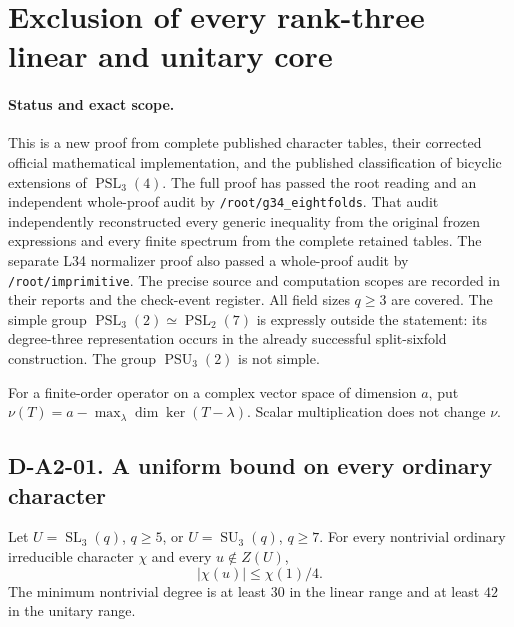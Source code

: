 \section{Exclusion of every rank-three linear and unitary core}
\label{sec:a2-cores}

\paragraph{Status and exact scope.}
This is a new proof from complete published character tables, their
corrected official mathematical implementation, and the published
classification of bicyclic extensions of $\operatorname{PSL}_3(4)$.
The full proof has passed the root reading and an independent whole-proof
audit by \texttt{/root/g34\_eightfolds}.  That audit independently
reconstructed every generic inequality from the original frozen expressions
and every finite spectrum from the complete retained tables.  The separate
L34 normalizer proof also passed a whole-proof audit by
\texttt{/root/imprimitive}.  The precise source and computation scopes
are recorded in their reports and the check-event register.
All field sizes $q\ge3$ are covered.  The simple group
$\operatorname{PSL}_3(2)\simeq\operatorname{PSL}_2(7)$ is expressly
outside the statement: its degree-three representation occurs in the
already successful split-sixfold construction.  The group
$\operatorname{PSU}_3(2)$ is not simple.

For a finite-order operator on a complex vector space of dimension $a$,
put $\nu(T)=a-\max_\lambda\dim\ker(T-\lambda)$.
Scalar multiplication does not change $\nu$.

\subsection*{D-A2-01. A uniform bound on every ordinary character}

\begin{lemma}[D-A2-01]
\label{D-A2-01}
Let $U=\operatorname{SL}_3(q)$, $q\ge5$, or
$U=\operatorname{SU}_3(q)$, $q\ge7$.  For every nontrivial ordinary
irreducible character $\chi$ and every $u\notin Z(U)$,
\[
                 |\chi(u)|\le\chi(1)/4.                 \tag{A2.1}
\]
The minimum nontrivial degree is at least $30$ in the linear range
and at least $42$ in the unitary range.
\end{lemma}

